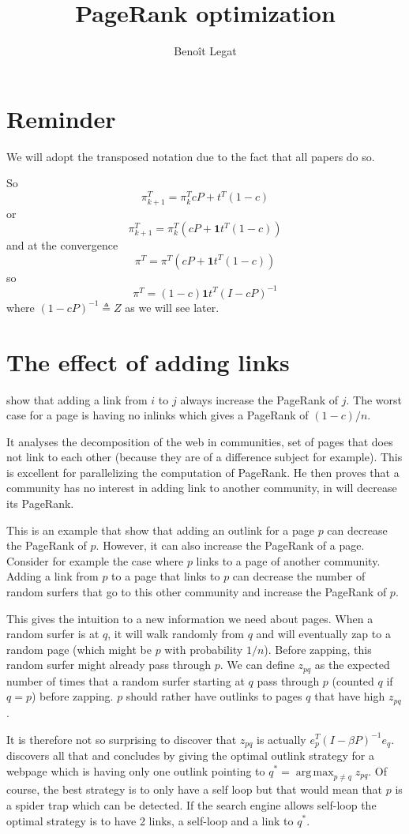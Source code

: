 \documentclass{article}
\author{Benoît Legat}
\title{PageRank optimization}
\DeclareMathOperator*{\argmax}{arg\,max}
\newcommand{\1}{\mathbf{1}}
\theoremstyle{definition}
\begin{document}
\maketitle

\section{Reminder}
We will adopt the transposed notation due to the fact that all papers do so.

So
\[ \pi_{k+1}^T = \pi_k^T cP + t^T(1-c) \]
or
\[ \pi_{k+1}^T = \pi_k^T (cP + \1 t^T(1-c)) \]
and at the convergence
\[ \pi^T = \pi^T (cP + \1 t^T(1-c)) \]
so
\[ \pi^T = (1-c)\1 t^T(I - cP)^{-1} \]
where $(1 - cP)^{-1} \triangleq Z$ as we will see later.

\section{The effect of adding links}
\cite{avrachenkov2004decomposition} show that adding a link
from $i$ to $j$ always increase the PageRank of $j$.
The worst case for a page is having no inlinks which gives a PageRank of $(1-c)/n$.

It analyses the decomposition of the web in communities,
set of pages that does not link to each other (because they are of a difference subject for example).
This is excellent for parallelizing the computation of PageRank.
He then proves that a community has no interest in adding link to another community,
in will decrease its PageRank.

This is an example that show that adding an outlink for a page $p$ can decrease the PageRank of $p$.
However, it can also increase the PageRank of a page.
Consider for example the case where $p$ links to a page of another community.
Adding a link from $p$ to a page that links to $p$ can decrease the number of random surfers that go to this other community and increase the PageRank of $p$.

This gives the intuition to a new information we need about pages.
When a random surfer is at $q$, it will walk randomly from $q$ and will eventually zap to a random page (which might be $p$ with probability $1/n$).
Before zapping, this random surfer might already pass through $p$.
We can define $z_{pq}$ as the expected number of times that a random surfer starting at $q$ pass through $p$ (counted $q$ if $q=p$) before zapping.
$p$ should rather have outlinks to pages $q$ that have high $z_{pq}$.

It is therefore not so surprising to discover that $z_{pq}$ is actually $e_p^T(I-\beta P)^{-1}e_q$.
\cite{avrachenkov2006effect} discovers all that and concludes by giving the optimal outlink strategy for a webpage which is having only one outlink pointing to $q^* = \argmax_{p \neq q} z_{pq}$.
Of course, the best strategy is to only have a self loop but that would mean that $p$ is a spider trap which can be detected.
If the search engine allows self-loop the optimal strategy is to have 2 links, a self-loop and a link to $q^*$.
\end{document}
